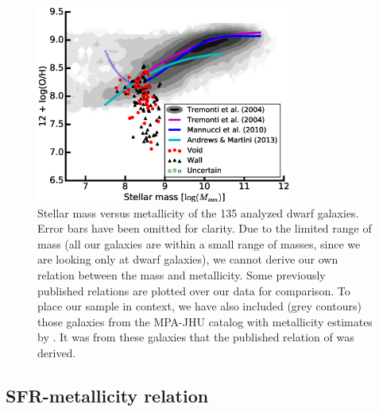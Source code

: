 \begin{figure}
    \centering
    \includegraphics[width=0.75\textwidth]{Images/Paper1/MZ_1sig_I06_dwarf_SF_t3_python}
    \caption[Stellar mass versus metallicity for 135 dwarf galaxy sample]
    {Stellar mass versus metallicity of the 135 analyzed dwarf galaxies.  Error 
    bars have been omitted for clarity.  Due to the limited range of mass (all 
    our galaxies are within a small range of masses, since we are looking only 
    at dwarf galaxies), we cannot derive our own relation between the mass and 
    metallicity.  Some previously published relations are plotted over our data 
    for comparison.  To place our sample in context, we have also included (grey 
    contours) those galaxies from the MPA-JHU catalog with metallicity estimates 
    by \cite{Tremonti04}.  It was from these galaxies that the published 
    relation of \cite{Tremonti04} was derived.}
    \label{fig:MZrelation}
\end{figure}



\subsection{SFR-metallicity relation}

